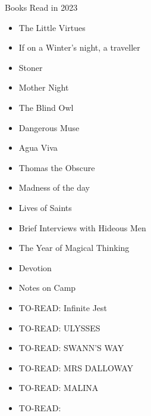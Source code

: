 Books Read in 2023
\begin{itemize}
    \item The Little Virtues
    \item If on a Winter's night, a traveller
    \item Stoner
    \item Mother Night
    \item The Blind Owl
    \item Dangerous Muse
    \item Agua Viva
    \item Thomas the Obscure
    \item Madness of the day
    \item Lives of Saints
    \item Brief Interviews with Hideous Men
    \item The Year of Magical Thinking
    \item Devotion
    \item Notes on Camp
    \item TO-READ: Infinite Jest
    \item TO-READ: ULYSSES
    \item TO-READ: SWANN'S WAY
    \item TO-READ: MRS DALLOWAY
    \item TO-READ: MALINA
    \item TO-READ: 
\end{itemize}